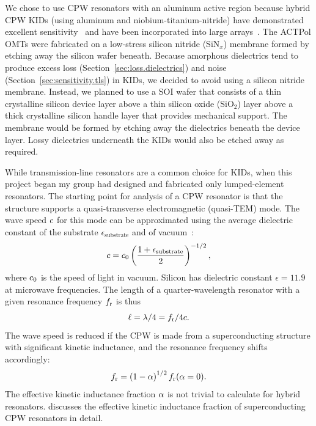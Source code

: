 We chose to use CPW resonators with an aluminum active region because hybrid CPW KIDs (using aluminum and niobium-titanium-nitride) have demonstrated excellent sensitivity~\autocite{Yates2011APL,Janssen2013APL,Janssen2014SPIE} and have been incorporated into large arrays~\autocite{Baselmans2017AA}.
The ACTPol OMTs were fabricated on a low-stress silicon nitride (SiN$_x$) membrane formed by etching away the silicon wafer beneath.
Because amorphous dielectrics tend to produce excess loss (Section~\ref{sec:loss.dielectrics}) and noise (Section~\ref{sec:sensitivity.tls}) in KIDs, we decided to avoid using a silicon nitride membrane.
Instead, we planned to use a SOI wafer that consists of a thin crystalline silicon device layer above a thin silicon oxide (SiO$_2$) layer above a thick crystalline silicon handle layer that provides mechanical support.
The membrane would be formed by etching away the dielectrics beneath the device layer.
Lossy dielectrics underneath the KIDs would also be etched away as required.

While transmission-line resonators are a common choice for KIDs, when this project began my group had designed and fabricated only lumped-element resonators.
The starting point for analysis of a CPW resonator is that the structure supports a quasi-transverse electromagnetic (quasi-TEM) mode.
The wave speed $c$ for this mode can be approximated using the average dielectric constant of the substrate $\epsilon_\mathrm{substrate}$ and of vacuum~\autocite{Wen1969IEEE}:
\begin{equation}
c
  =
  c_0 \left( \frac{1 + \epsilon_\mathrm{substrate}}{2} \right)^{-1/2},
\end{equation}
where $c_0$ is the speed of light in vacuum.
Silicon has dielectric constant $\epsilon = 11.9$ at microwave frequencies.
The length of a quarter-wavelength resonator with a given resonance frequency $f_{\mathrm{r}}$ is thus
\begin{equation}
\ell
  =
  \lambda / 4
  =
  f_{\mathrm{r}} / 4 c.
\end{equation}
The wave speed is reduced if the CPW is made from a superconducting structure with significant kinetic inductance, and the resonance frequency shifts accordingly:
\begin{equation}
f_{\mathrm{r}}
  =
  \left(1 - \alpha \right)^{1/2} f_{\mathrm{r}}(\alpha = 0).
\end{equation}
The effective kinetic inductance fraction $\alpha$ is not trivial to calculate for hybrid resonators.
\textcite{Gao2008} discusses the effective kinetic inductance fraction of superconducting CPW resonators in detail.

